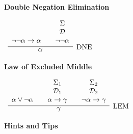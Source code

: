 \documentclass[11pt]{report}
\begin{document}
\begin{enumerate}
		\begin{center}
		\begin{minipage}{0.45\textwidth}
		\centering

			\textbf{Double Negation Elimination}

			$\begin{array}{ c }
			\infer[\text{DNE}]{\alpha}
			{
			\begin{array}{c} \  \\ \ \\ \lnot \lnot\alpha \to \alpha \end{array}
			& 
			\begin{array}{c} \Sigma  \\ \mathcal{D} \\ \lnot \lnot\alpha \end{array}							 
			}
			\end{array}$
		\end{minipage}%
	\hfill
		\begin{minipage}{0.45\textwidth}
		\centering

			\textbf{Law of Excluded Middle}

			$\begin{array}{ c }
			\infer[\text{LEM}]{\gamma}
			{
			\begin{array}{c} \  \\ \ \\ \alpha\lor\lnot\alpha \end{array}
			& 
			\begin{array}{c} \Sigma_{1}  \\ \mathcal{D}_{1} \\ \alpha\rightarrow\gamma \end{array}				
			& 
			\begin{array}{c} \Sigma_{2}  \\ \mathcal{D}_{2} \\ \lnot\alpha\rightarrow\gamma \end{array}				 
			}
			\end{array}$
		\end{minipage}
	\end{center}
	
	\textbf{Hints and Tips}


\end{enumerate}
\end{document}
